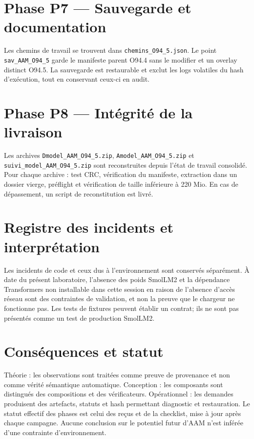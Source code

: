 \documentclass[11pt,a4paper]{article}
\begin{document}
\section{Phase P7 — Sauvegarde et documentation}
Les chemins de travail se trouvent dans \texttt{chemins\_O94\_5.json}. Le point \texttt{sav\_AAM\_O94\_5} garde le manifeste parent O94.4 sans le modifier et un overlay distinct O94.5. La sauvegarde est restaurable et exclut les logs volatiles du hash d'exécution, tout en conservant ceux-ci en audit.

\section{Phase P8 — Intégrité de la livraison}
Les archives \texttt{Dmodel\_AAM\_O94\_5.zip}, \texttt{Amodel\_AAM\_O94\_5.zip} et \texttt{suivi\_model\_AAM\_O94\_5.zip} sont reconstruites depuis l'état de travail consolidé. Pour chaque archive : test CRC, vérification du manifeste, extraction dans un dossier vierge, préflight et vérification de taille inférieure à 220 Mio. En cas de dépassement, un script de reconstitution est livré.

\section{Registre des incidents et interprétation}
Les incidents de code et ceux dus à l'environnement sont conservés séparément. À date du présent laboratoire, l'absence des poids SmolLM2 et la dépendance Transformers non installable dans cette session en raison de l'absence d'accès réseau sont des contraintes de validation, et non la preuve que le chargeur ne fonctionne pas. Les tests de fixtures peuvent établir un contrat; ils ne sont pas présentés comme un test de production SmolLM2.

\section{Conséquences et statut}
Théorie : les observations sont traitées comme preuve de provenance et non comme vérité sémantique automatique. Conception : les composants sont distingués des compositions et des vérificateurs. Opérationnel : les demandes produisent des artefacts, statuts et hash permettant diagnostic et restauration. Le statut effectif des phases est celui des reçus et de la checklist, mise à jour après chaque campagne. Aucune conclusion sur le potentiel futur d'AAM n'est inférée d'une contrainte d'environnement.
\end{document}
